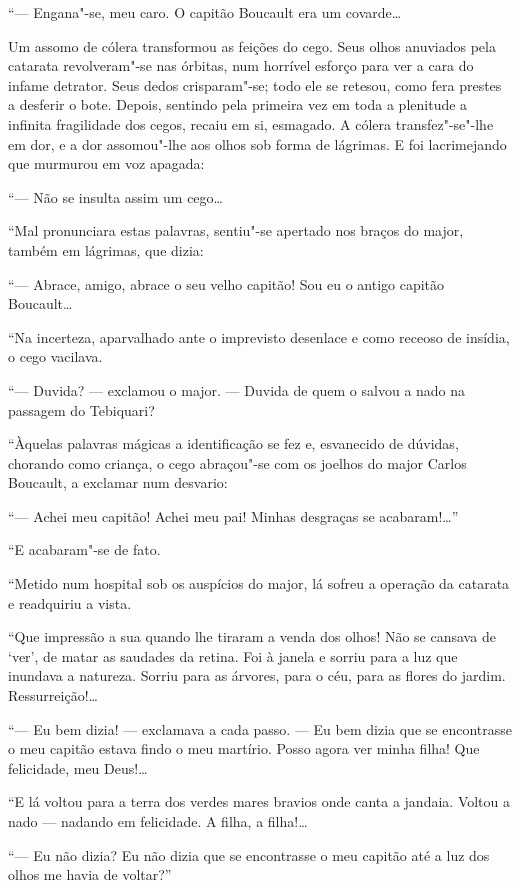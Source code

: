 ``--- Engana"-se, meu caro. O capitão Boucault era um covarde\ldots{}

Um assomo de cólera transformou as feições do cego. Seus olhos anuviados
pela catarata revolveram"-se nas órbitas, num horrível esforço para ver a
cara do infame detrator. Seus dedos crisparam"-se; todo ele se retesou,
como fera prestes a desferir o bote. Depois, sentindo pela primeira vez
em toda a plenitude a infinita fragilidade dos cegos, recaiu em si,
esmagado. A cólera transfez"-se"-lhe em dor, e a dor assomou"-lhe aos olhos
sob forma de lágrimas. E foi lacrimejando que murmurou em voz apagada:

``--- Não se insulta assim um cego\ldots{}

``Mal pronunciara estas palavras, sentiu"-se apertado nos braços do
major, também em lágrimas, que dizia:

``--- Abrace, amigo, abrace o seu velho capitão! Sou eu o antigo capitão
Boucault\ldots{}

``Na incerteza, aparvalhado ante o imprevisto desenlace e como receoso
de insídia, o cego vacilava.

``--- Duvida? --- exclamou o major. --- Duvida de quem o salvou a nado
na passagem do Tebiquari?

``Àquelas palavras mágicas a identificação se fez e, esvanecido de
dúvidas, chorando como criança, o cego abraçou"-se com os joelhos do
major Carlos Boucault, a exclamar num desvario:

``--- Achei meu capitão! Achei meu pai! Minhas desgraças se
acabaram!\ldots{}''

``E acabaram"-se de fato.

``Metido num hospital sob os auspícios do major, lá sofreu a operação da
catarata e readquiriu a vista.

``Que impressão a sua quando lhe tiraram a venda dos olhos! Não se
cansava de `ver', de matar as saudades da retina. Foi à janela e sorriu
para a luz que inundava a natureza. Sorriu para as árvores, para o céu,
para as flores do jardim. Ressurreição!\ldots{}

``--- Eu bem dizia! --- exclamava a cada passo. --- Eu bem dizia que se
encontrasse o meu capitão estava findo o meu martírio. Posso agora ver
minha filha! Que felicidade, meu Deus!\ldots{}

``E lá voltou para a terra dos verdes mares bravios onde canta a
jandaia. Voltou a nado --- nadando em felicidade. A filha, a filha!\ldots{}

``--- Eu não dizia? Eu não dizia que se encontrasse o meu capitão até a
luz dos olhos me havia de voltar?''

